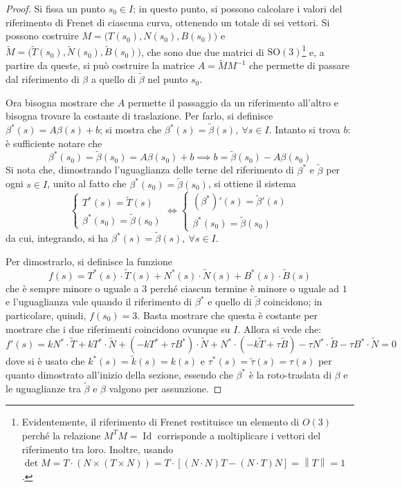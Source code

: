 \documentclass[12pt]{article}
\theoremstyle{style}
\numberwithin{equation}{subsection}
\begin{document}
\begin{proof}
	Si fissa un punto $s_0 \in I$; in questo punto, si possono calcolare i valori del riferimento di Frenet di ciascuna curva, ottenendo un totale di sei vettori.
	Si possono costruire $M=\big(T(s_0), N(s_0),B(s_0)\big)$ e $\widetilde{M}=\big(\widetilde{T}(s_0),\widetilde{N}(s_0),\widetilde{B}(s_0)\big) $, che sono due  due matrici di $\mathrm{SO}(3) $\footnote{Evidentemente, il riferimento di Frenet restituisce un elemento di $O(3)$ perch\'e la relazione $M^T M = \operatorname{Id} $ corrisponde a moltiplicare i vettori del riferimento tra loro. Inoltre, usando $\det M = T \cdot (N \times (T \times N)) = T\cdot [(N\cdot N)T-(N\cdot T)N]=\left\lVert T \right\rVert =1$.} e, a partire da queste, si pu\`o costruire la matrice $A = \widetilde{M}M^{-1}$ che permette di passare dal riferimento di $\beta $ a quello di $\widetilde{\beta }$ nel punto $s_0$.

	Ora bisogna mostrare che $A$ permette il passaggio da un riferimento all'altro e bisogna trovare la costante di traslazione.
	Per farlo, si definisce $\beta ^*(s) = A\beta (s) + b$; si mostra che $\beta ^*(s) = \widetilde{\beta }(s), \ \forall s \in I$.
	Intanto si trova $b$: \`e sufficiente notare che
	\[
	\beta ^*(s_0) = \widetilde{\beta }(s_0) = A \beta (s_0) + b \implies b = \widetilde{\beta }(s_0) - A \beta (s_0)
	\] 
Si nota che, dimostrando l'uguaglianza delle terne del riferimento di $\beta ^*$ e $\widetilde{\beta }$ per ogni $s \in I$, unito al fatto che $\beta ^*(s_0) = \widetilde{\beta }(s_0)$, si ottiene il sistema
\[
\begin{cases}
	T^*(s) = \widetilde{T}(s)\\
	\beta ^*(s_0) = \widetilde{\beta }(s_0)
\end{cases}\iff \begin{cases}
(\beta ^*)'(s) = \widetilde{\beta }'(s)\\
	\beta ^*(s_0) = \widetilde{\beta }(s_0)
\end{cases}
\] 
da cui, integrando, si ha $\beta ^*(s) = \widetilde{\beta} (s), \ \forall s \in I$.

Per dimostrarlo, si definisce la funzione
\[
f(s) = T^*(s) \cdot \widetilde{T}(s) + N^*(s) \cdot \widetilde{N}(s) + B^*(s) \cdot \widetilde{B}(s)
\] 
che \`e sempre minore o uguale a $3$ perch\'e ciascun termine \`e minore o uguale ad $1$ e l'uguaglianza vale quando il riferimento di $\beta ^*$ e quello di $\widetilde{\beta }$ coincidono; in particolare, quindi, $f(s_0) = 3$.
Basta mostrare che questa \`e costante per mostrare che i due riferimenti coincidono ovunque su $I$.
Allora si vede che:
\[
f'(s) = k N^* \cdot \widetilde{T} + k T^* \cdot \widetilde{N} +(-kT^*+\tau B^*)\cdot  \widetilde{N} + N^* \cdot (-k\widetilde{T}+\tau \widetilde{B}) - \tau N^* \cdot \widetilde{B}- \tau B^*\cdot \widetilde{N}=0
\] 
dove si \`e usato che $k^*(s) = \widetilde{k}(s) = k(s)$ e $\tau ^*(s) = \widetilde{\tau }(s) = \tau (s)$ per quanto dimostrato all'inizio della sezione, essendo che $\beta ^*$ \`e la roto-traslata di $\beta $ e le uguaglianze tra $\widetilde{\beta }$ e $\beta $ valgono per assunzione.
\end{proof}
\end{document}
